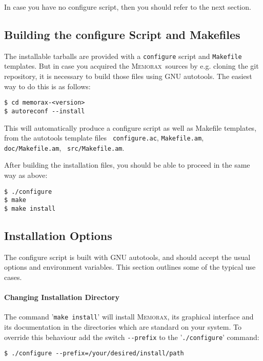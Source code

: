 \documentclass[a4paper]{article}
\newcommand{\memorax}{\textsc{Memorax}}
\begin{document}
In case you have no configure script, then you should refer to the
next section.

\subsection{Building the configure Script and Makefiles}

   The installable tarballs are provided with a {\tt configure} script
   and {\tt Makefile} templates. But in case you acquired the
   \memorax\ sources by e.g. cloning the git repository, it is
   necessary to build those files using GNU autotools. The easiest way
   to do this is as follows:

\begin{verbatim}
$ cd memorax-<version>
$ autoreconf --install
\end{verbatim}

   This will automatically produce a configure script as well as
   Makefile templates, from the autotools template files {\tt
     configure.ac}, {\tt Makefile.am}, {\tt doc/Makefile.am}, {\tt
     src/Makefile.am}.

   After building the installation files, you should be able to
   proceed in the same way as above:

\begin{verbatim}
$ ./configure
$ make
$ make install
\end{verbatim}


\subsection{Installation Options}

   The configure script is built with GNU autotools, and should accept
   the usual options and environment variables. This section outlines
   some of the typical use cases.

\paragraph{Changing Installation Directory}

   The command '\verb+make install+' will install \memorax, its graphical
   interface and its documentation in the directories which are
   standard on your system. To override this behaviour add the switch
   \verb+--prefix+ to the '\verb+./configure+' command:

\begin{verbatim}
$ ./configure --prefix=/your/desired/install/path
\end{verbatim}
\end{document}
